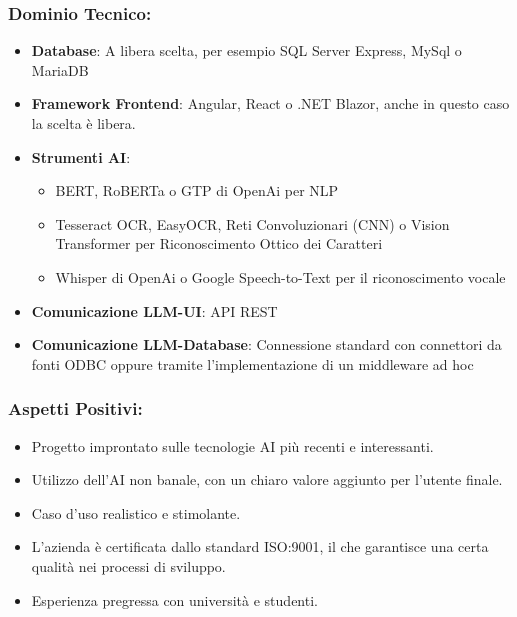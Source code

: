 \documentclass[a4paper,12pt]{article}
\begin{document}
\subsubsection*{Dominio Tecnico:}
\begin{itemize}
    \item \textbf{Database}: A libera scelta, per esempio SQL Server Express, MySql o MariaDB
    \item \textbf{Framework Frontend}: Angular, React o .NET Blazor, anche in questo caso la scelta è libera.
    \item \textbf{Strumenti AI}: \begin{itemize}
                            \item BERT, RoBERTa o GTP di OpenAi per NLP
                            \item Tesseract OCR, EasyOCR, Reti Convoluzionari (CNN) o Vision Transformer per Riconoscimento Ottico dei Caratteri
                            \item Whisper di OpenAi o Google Speech-to-Text per il riconoscimento vocale
                        \end{itemize}
    \item \textbf{Comunicazione LLM-UI}: API REST
    \item \textbf{Comunicazione LLM-Database}: Connessione standard con connettori da fonti ODBC oppure tramite l'implementazione di un middleware ad hoc
\end{itemize}
\subsubsection*{Aspetti Positivi:}
\begin{itemize}
    \item Progetto improntato sulle tecnologie AI più recenti e interessanti.
    \item Utilizzo dell'AI non banale, con un chiaro valore aggiunto per l'utente finale.
    \item Caso d'uso realistico e stimolante.
    \item L'azienda è certificata dallo standard ISO:9001, il che garantisce una certa qualità nei processi di sviluppo.
    \item Esperienza pregressa con università e studenti.
\end{itemize}
\end{document}
